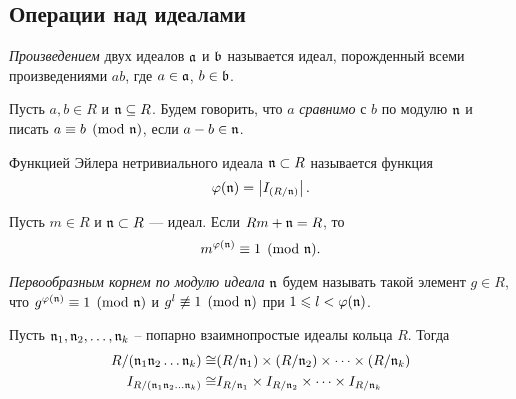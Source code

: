 \documentclass[_00_dissertation.tex]{subfiles}
\begin{document}
\subsection{Операции над идеалами}

\begin{definition}
    \emph{Произведением} двух идеалов $\mathfrak{a}$ и $\mathfrak{b}$ называется идеал, порожденный всеми произведениями $ab$, где $a \in \mathfrak{a}$, $b \in \mathfrak{b}$.
\end{definition}

\begin{definition}
    Пусть $a, b \in R$ и $\mathfrak{n} \subseteq R$.
    Будем говорить, что $a$ \emph{сравнимо} с $b$ по модулю $\mathfrak{n}$ и писать $a \equiv b \pmod{\mathfrak{n}}$, если $a - b \in \mathfrak{n}$.
\end{definition}

\begin{definition}\cite{source:Petukhova}
    Функцией Эйлера нетривиального идеала $\mathfrak{n} \subset R$ называется функция
    \begin{equation*}
        \varphi(\mathfrak{n}) = \left|
            I_{(R/\mathfrak{n})}
        \right|.
    \end{equation*}
\end{definition}

\begin{statement}\cite{source:Petukhova}
    Пусть $m \in R$ и $\mathfrak{n} \subset R$ --- идеал.
    Если $Rm + \mathfrak{n} = R$, то
    \begin{equation*}
        m^{\varphi(\mathfrak{n})}\equiv 1 \pmod{\mathfrak{n}}.
    \end{equation*}
\end{statement}

\begin{definition}
    \emph{Первообразным корнем по модулю идеала} $\mathfrak{n}$ будем называть такой элемент $g \in R$, что $g^{\varphi (\mathfrak{n})} \equiv 1 \pmod{\mathfrak{n}}$ и $g^{l} \not\equiv 1 \pmod{\mathfrak{n}}$ при $1 \leqslant l < \varphi(\mathfrak{n})$.
\end{definition}

\begin{statement}\label{statement:chinese_remainder_theorem}
    Пусть $\mathfrak{n}_1, \mathfrak{n}_2, \dots, \mathfrak{n}_k$ -- попарно взаимнопростые идеалы кольца $R$.
    Тогда
    \begin{equation*}
        \begin{split}
            R/(\mathfrak{n}_1\mathfrak{n}_2\dots\mathfrak{n}_k) \cong & (R/\mathfrak{n}_1) \times (R/\mathfrak{n}_2) \times \dots \times (R/\mathfrak{n}_k)\\
            I_{R/(\mathfrak{n}_1\mathfrak{n}_2\dots\mathfrak{n}_k)} \cong & I_{R/\mathfrak{n}_1} \times I_{R/\mathfrak{n}_2} \times \dots \times I_{R/\mathfrak{n}_k}
        \end{split}
    \end{equation*}
\end{statement}
\end{document}
